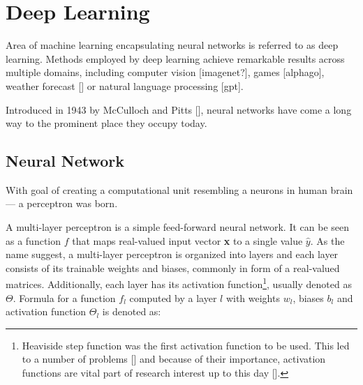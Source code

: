 
\section{Deep Learning}

Area of machine learning encapsulating neural networks is referred to as deep learning. Methods employed by deep learning achieve remarkable results across multiple domains, including computer vision [imagenet?], games [alphago], weather forecast [] or natural language processing [gpt].

Introduced in 1943 by McCulloch and Pitts [], neural networks have come a long way to the prominent place they occupy today.



\subsection*{Neural Network}

With goal of creating a computational unit resembling a neurons in human brain --- a perceptron was born. 

A multi-layer perceptron is a simple feed-forward neural network. It can be seen as a function $f$ that maps real-valued input vector \textbf{x} to a single value $\hat{y}$. As the name suggest, a multi-layer perceptron is organized into layers and each layer consists of its trainable weights and biases, commonly in form of a real-valued matrices. Additionally, each layer has its activation function\footnote{Heaviside step function was the first activation function to be used. This led to a number of problems [] and because of their importance, activation functions are vital part of research interest up to this day [].}, usually denoted as $\Theta$. Formula for a function $f_l$ computed by a layer $l$ with weights $w_l$, biases $b_l$ and activation function $\Theta_l$ is denoted as:

